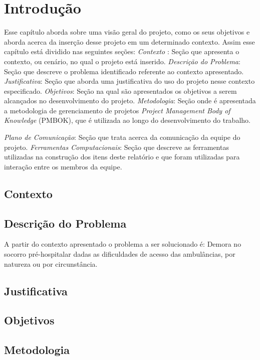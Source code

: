 \chapter[Introdução]{Introdução}\label{cap1}

Esse capítulo aborda sobre uma visão geral do projeto, como os seus objetivos e aborda acerca da inserção desse projeto em um determinado contexto. Assim esse capítulo está dividido nas seguintes seções:
\textit{Contexto} : Seção que apresenta o contexto, ou cenário, no qual o projeto está inserido.
\textit{Descrição do Problema}: Seção que descreve o problema identificado referente ao contexto apresentado.
\textit{Justificativa}: Seção que aborda uma justificativa do uso do projeto nesse contexto especificado.
\textit{Objetivos}: Seção na qual são apresentados os objetivos a serem alcançados no desenvolvimento do projeto.
\textit{Metodologia}: Seção onde é apresentada a metodologia de gerenciamento de projetos \textit{Project Management Body of Knowledge} (PMBOK), que é utilizada ao longo do desenvolvimento do trabalho.

\textit{Plano de Comunicação}: Seção que trata acerca da comunicação da equipe do projeto.
\textit{Ferramentas Computacionais}: Seção que descreve as ferramentas utilizadas na construção dos itens deste relatório e que foram utilizadas para interação entre os membros da equipe.


\section{Contexto}
  

\section{Descrição do Problema}

A partir do contexto apresentado o problema a ser solucionado é:
Demora no socorro pré-hospitalar dadas as dificuldades de acesso das ambulâncias, por natureza ou por circunstância.
  
\section{Justificativa}
  

\section{Objetivos}
  


\section{Metodologia}
   

